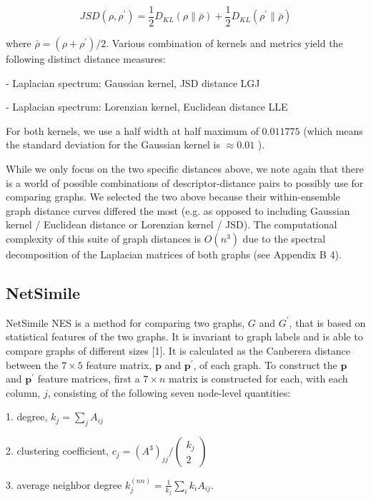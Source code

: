 $$
J S D\left(\rho, \rho^{\prime}\right)=\frac{1}{2} D_{K L}(\rho \| \bar{\rho})+\frac{1}{2} D_{K L}\left(\rho^{\prime} \| \bar{\rho}\right)
$$

where $\bar{\rho}=\left(\rho+\rho^{\prime}\right) / 2$. Various combination of kernels and metrics yield the following distinct distance measures:

- Laplacian spectrum: Gaussian kernel, JSD distance LGJ

- Laplacian spectrum: Lorenzian kernel, Euclidean distance LLE

For both kernels, we use a half width at half maximum of $0.011775$ (which means the standard deviation for the Gaussian kernel is $\approx 0.01$ ).

While we only focus on the two specific distances above, we note again that there is a world of possible combinations of descriptor-distance pairs to possibly use for comparing graphs. We selected the two above because their within-ensemble graph distance curves differed the most (e.g. as opposed to including Gaussian kernel / Euclidean distance or Lorenzian kernel / JSD). The computational complexity of this suite of graph distances is $O\left(n^{3}\right)$ due to the spectral decomposition of the Laplacian matrices of both graphs (see Appendix B 4).

\subsection{NetSimile}
NetSimile NES is a method for comparing two graphs, $G$ and $G^{\prime}$, that is based on statistical features of the two graphs. It is invariant to graph labels and is able to compare graphs of different sizes [1]. It is calculated as the Canberera distance between the $7 \times 5$ feature matrix, $\mathbf{p}$ and $\mathbf{p}^{\prime}$, of each graph. To construct the $\mathbf{p}$ and $\mathbf{p}^{\prime}$ feature matrices, first a $7 \times n$ matrix is constructed for each, with each column, $j$, consisting of the following seven node-level quantities:

1. degree, $k_{j}=\sum_{j} A_{i j}$

2. clustering coefficient, $c_{j}=\left(A^{3}\right)_{j j} /\left(\begin{array}{c}k_{j} \\ 2\end{array}\right)$

3. average neighbor degree $k_{j}^{(n n)}=\frac{1}{k_{j}} \sum_{i} k_{i} A_{i j}$.

